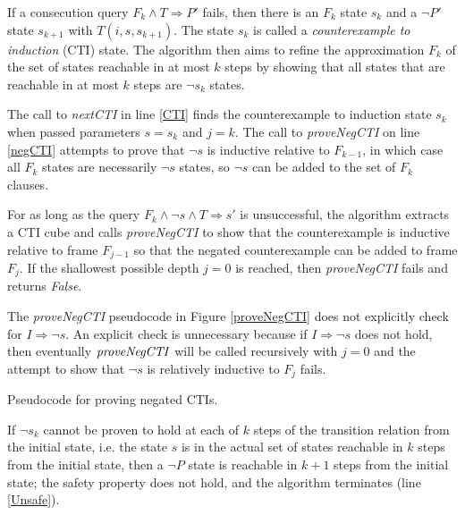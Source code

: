 \documentclass[12pt,a4paper,twoside,openright]{report}
\begin{document}
{If a consecution query $F_k \wedge T \Rightarrow P'$ fails, then
there is an $F_k$ state $s_k$ and a $\neg P'$ state $s_{k + 1}$ with $T(i,s,s_{k + 1})$.
The state $s_k$ is called a \emph{counterexample to induction} (CTI) state.
The algorithm then aims to refine the approximation $F_k$ of the set of states
reachable in at most $k$ steps by showing that all states that are
reachable in at most $k$ steps are $\neg s_k$ states.

The call to {\it nextCTI} in line \ref{CTI} finds the counterexample to
induction state $s_k$ when passed parameters $s = s_k$ and $j = k$.
The call to {\it proveNegCTI} on line \ref{negCTI}
attempts to prove that $\neg s$ is inductive relative to $F_{k - 1}$,
in which case all $F_k$ states are necessarily $\neg s$ states, so $\neg s$ can
be added to the set of $F_k$ clauses.

For as long as the query
$F_k \wedge \neg s \wedge T \Rightarrow s'$ is unsuccessful,
the algorithm extracts a CTI cube and
calls {\it proveNegCTI} to show that the counterexample is
inductive relative to frame $F_{j - 1}$ so that the negated
counterexample can be added to frame $F_j$.
If the shallowest possible depth $j = 0$ is reached, then
{\it proveNegCTI} fails and returns {\it False}.

The {\it proveNegCTI} pseudocode in Figure \ref{proveNegCTI}
does not explicitly check for $I \Rightarrow
\neg s$. An explicit check is unnecessary because if
$I \Rightarrow \neg s$ does not hold, then eventually ${\it proveNegCTI}$
will be called recursively with $j = 0$ and the attempt to show that
$\neg s$ is relatively inductive to $F_j$ fails.

\begin{algorithm}[t]
\DontPrintSemicolon
{}
\caption{Pseudocode for proving negated CTIs.}
\label{proveNegCTI}
\end{algorithm}

If $\neg s_k$ cannot be proven to hold at each of $k$ steps of
the transition relation from the initial state, i.e. the state $s$ is in the actual
set of states reachable in $k$ steps from the initial state, then a $\neg P$ state
is reachable in $k + 1$ steps from the initial state; the safety property does not
hold, and the algorithm terminates (line \ref{Unsafe}).

}
\end{document}
